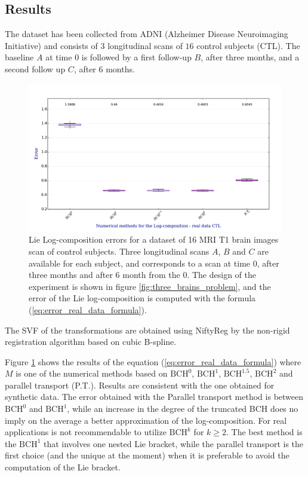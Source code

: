 \subsection{Results}

The dataset has been collected from ADNI (Alzheimer Disease Neuroimaging Initiative) \cite{jack2008alzheimer} and consists of $3$ longitudinal scans of $16$ control subjects (CTL).
The baseline $A$ at time $0$ is followed by a first follow-up $B$, after three months, and a second follow up $C$, after $6$ months.

\begin{figure}[!ht]
	\hspace{-1.0cm}
	\includegraphics[scale=0.5]{figures/svf_log_composition_boxplot_real_data_CTL.pdf}
	\caption{Lie Log-composition errors for a dataset of 16 MRI T1 brain images scan of control subjects. Three longitudinal scans $A$, $B$ and $C$ are available for each subject, and corresponds to a scan at time $0$, after three months and after $6$ month from the $0$. The design of the experiment is shown in figure \ref{fig:three_brains_problem}, and the error of the Lie log-composition is computed with the formula (\ref{eq:error_real_data_formula}).}
	\label{fig:svf_log_composition_boxplot_real_data_CTL}
\end{figure}

The SVF of the transformations are obtained using NiftyReg by the non-rigid registration algorithm based on cubic B-spline. 

Figure \ref{fig:svf_log_composition_boxplot_real_data_CTL} shows the results of the equation (\ref{eq:error_real_data_formula}) where $M$ is one of the numerical methods based on $\text{BCH}^0$, $\text{BCH}^1$, $\text{BCH}^{1.5}$, $\text{BCH}^2$ and parallel transport (P.T.). Results are consistent with the one obtained for synthetic data. The error obtained with the Parallel transport method is between $\text{BCH}^0$ and $\text{BCH}^1$, while an increase in the degree of the truncated BCH does no imply on the average a better approximation of the log-composition. For real applications is not recommendable to utilize $\text{BCH}^k$ for $k\geq 2$. The best method is the $\text{BCH}^1$ that involves one nested Lie bracket, while the parallel transport is the first choice (and the unique at the moment) when it is preferable to avoid the computation of the Lie bracket. 



